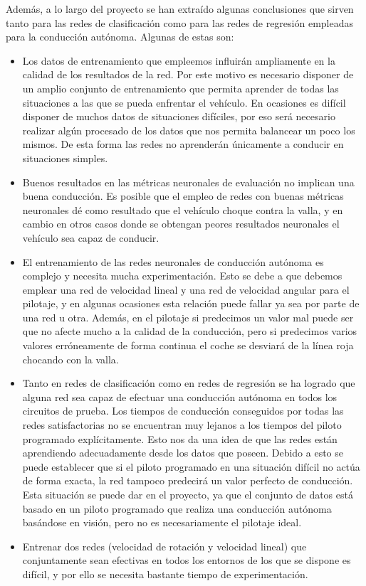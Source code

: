 Además, a lo largo del proyecto se han extraído algunas conclusiones que sirven tanto para las redes de clasificación como para las redes de regresión empleadas para la conducción autónoma. Algunas de estas son:\\

\begin{itemize}
    \item Los datos de entrenamiento que empleemos influirán ampliamente en la calidad de los resultados de la red. Por este motivo es necesario disponer de un amplio conjunto de entrenamiento que permita aprender de todas las situaciones a las que se pueda enfrentar el vehículo. En ocasiones es difícil disponer de muchos datos de situaciones difíciles, por eso será necesario realizar algún procesado de los datos que nos permita balancear un poco los mismos. De esta forma las redes no aprenderán únicamente a conducir en situaciones simples.
    
    \item Buenos resultados en las métricas neuronales de evaluación no implican una buena conducción. Es posible que el empleo de redes con buenas métricas neuronales dé como resultado que el vehículo choque contra la valla, y en cambio en otros casos donde se obtengan peores resultados neuronales el vehículo sea capaz de conducir.
    
    \item El entrenamiento de las redes neuronales de conducción autónoma es complejo y necesita mucha experimentación. Esto se debe a que debemos emplear una red de velocidad lineal y una red de velocidad angular para el pilotaje, y en algunas ocasiones esta relación puede fallar ya sea por parte de una red u otra. Además, en el pilotaje si predecimos un valor mal puede ser que no afecte mucho a la calidad de la conducción, pero si predecimos varios valores erróneamente de forma continua el coche se desviará de la línea roja chocando con la valla.
    
    \item Tanto en redes de clasificación como en redes de regresión se ha logrado que alguna red sea capaz de efectuar una conducción autónoma en todos los circuitos de prueba. Los tiempos de conducción conseguidos por todas las redes satisfactorias no se encuentran muy lejanos a los tiempos del piloto programado explícitamente. Esto nos da una idea de que las redes están aprendiendo adecuadamente desde los datos que poseen. Debido a esto se puede establecer que si el piloto programado en una situación difícil no actúa de forma exacta, la red tampoco predecirá un valor perfecto de conducción. Esta situación se puede dar en el proyecto, ya que el conjunto de datos está basado en un piloto programado que realiza una conducción autónoma basándose en visión, pero no es necesariamente el pilotaje ideal.
    
    \item Entrenar dos redes (velocidad de rotación y velocidad lineal) que conjuntamente sean efectivas en todos los entornos de los que se dispone es difícil, y por ello se necesita bastante tiempo de experimentación. 
\end{itemize}


